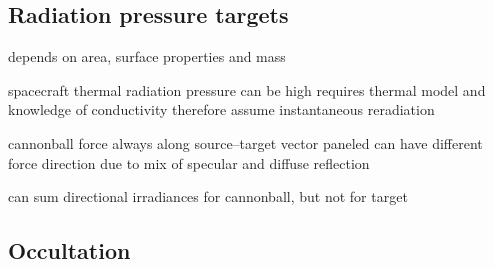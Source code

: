 \subsection{Radiation pressure targets}

depends on area, surface properties and mass

spacecraft thermal radiation pressure can be high
requires thermal model and knowledge of conductivity
therefore assume instantaneous reradiation

cannonball force always along source--target vector
paneled can have different force direction due to mix of specular and diffuse reflection

can sum directional irradiances for cannonball, but not for target



\subsection{Occultation}



